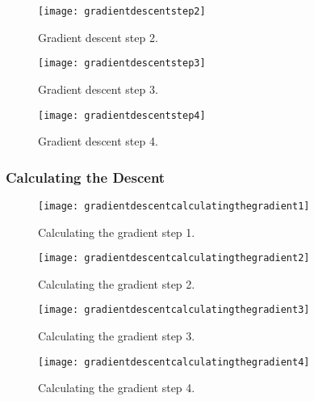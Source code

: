  	\begin{figure}[h]
		\centering
		\texttt{[image: gradientdescentstep2]}
		\caption[Gradient descent step 2]{Gradient descent step 2.}
		\label{fig:gradientdescentstep2}
	\end{figure}

 	\begin{figure}[h]
		\centering
		\texttt{[image: gradientdescentstep3]}
		\caption[Gradient descent step 3]{Gradient descent step 3.}
		\label{fig:gradientdescentstep3}
	\end{figure}

 	\begin{figure}[h]
		\centering
		\texttt{[image: gradientdescentstep4]}
		\caption[Gradient descent step 4]{Gradient descent step 4.}
		\label{fig:gradientdescentstep4}
	\end{figure}

	\subsubsection{Calculating the Descent}

 	\begin{figure}[h]
		\centering
		\texttt{[image: gradientdescentcalculatingthegradient1]}
		\caption[Calculating the gradient step 1]{Calculating the gradient step 1.}
		\label{fig:gradientdescentcalculatingthegradient1}
	\end{figure}

 	\begin{figure}[h]
		\centering
		\texttt{[image: gradientdescentcalculatingthegradient2]}
		\caption[Calculating the gradient step 2]{Calculating the gradient step 2.}
		\label{fig:gradientdescentcalculatingthegradient2}
	\end{figure}

 	\begin{figure}[h]
		\centering
		\texttt{[image: gradientdescentcalculatingthegradient3]}
		\caption[Calculating the gradient step 3]{Calculating the gradient step 3.}
		\label{fig:gradientdescentcalculatingthegradient3}
	\end{figure}

 	\begin{figure}[h]
		\centering
		\texttt{[image: gradientdescentcalculatingthegradient4]}
		\caption[Calculating the gradient step 4]{Calculating the gradient step 4.}
		\label{fig:gradientdescentcalculatingthegradient4}
	\end{figure}

